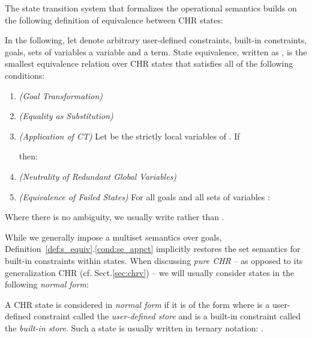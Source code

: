 \documentclass[acmtocl]{acmtrans2m}
\begin{document}
The state transition system that formalizes the operational semantics
builds on the following definition of equivalence
between CHR states:

\begin{definition}
\label{def:s_equiv}

In the following, let  denote arbitrary user-defined
constraints,  built-in constraints, 
goals,  sets of variables  a variable and  a term.
State equivalence, written as , is the smallest
equivalence relation over CHR states that satisfies all of the following
conditions:

\begin{enumerate}
\item \label{cond:se_comm} \emph{(Goal Transformation)}

\item \label{cond:se_subst} \emph{(Equality as Substitution)}

\item \label{cond:se_appct} \emph{(Application of CT)} Let  be the strictly local variables of . If

then:

\item \label{cond:se_global} \emph{(Neutrality of Redundant Global Variables)}

\item \label{cond:se_fail} \emph{(Equivalence of Failed States)}
For all goals  and all sets of variables :

\end{enumerate}
Where there is no ambiguity, we usually write  rather than
.
\end{definition}

While we generally impose a multiset semantics over goals,
Definition~\ref{def:s_equiv}.\ref{cond:se_appct} implicitly restores the set
semantics for built-in constraints within states. When discussing \emph{pure
CHR} -- as opposed to its generalization CHR (cf. Sect.\ref{sec:chrv}) --
we will usually consider states in the following \emph{normal form}:

\begin{definition}
\label{def:ternary-state}
A CHR state  is considered in \emph{normal form} if it is of the form
 where  is a user-defined
constraint called the \emph{user-defined store} and  is a
built-in constraint called the \emph{built-in store}. Such a
state is usually written in ternary notation: .
\end{definition}
\end{document}
